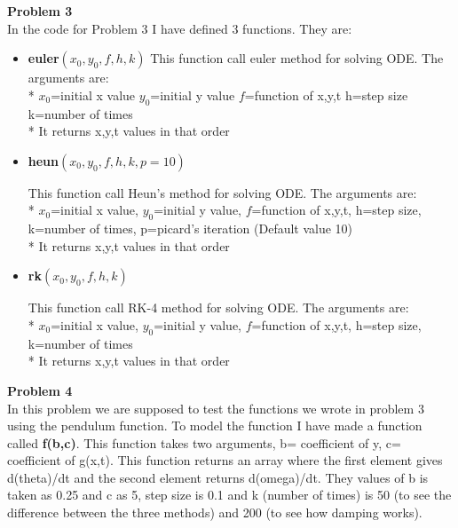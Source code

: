 \documentclass{article}
\begin{document}
\clearpage
\textbf{Problem 3}\vspace{1.5em}
\\
In the code for Problem 3 I have defined 3 functions. They are:
\begin{itemize}
\item{\textbf{euler$(x_0,y_0,f,h,k)$}}
This function call euler method for solving ODE. The arguments are:
\\*
       $ x_0$=initial x value
        $y_0$=initial y value
        $f$=function of x,y,t
        h=step size
        k=number of times
       \\*
        It returns x,y,t values in that order


\item{\textbf{heun$(x_0,y_0,f,h,k,p=10)$}}\vspace{0.2em}

This function call Heun's method for solving ODE. The arguments are:
\\*
        $x_0$=initial x value, 
        $y_0$=initial y value, 
        $f$=function of x,y,t, 
        h=step size, 
        k=number of times, 
        p=picard's iteration (Default value 10)
        \\*
        It returns x,y,t values in that order


\item{\textbf{rk$(x_0,y_0,f,h,k)$}}\vspace{0.2em}

This function call RK-4 method for solving ODE. The arguments are:
\\*
      $ x_0$=initial x value, 
        $y_0$=initial y value, 
        $f$=function of x,y,t, 
        h=step size, 
        k=number of times
        \\*
        It returns x,y,t values in that order


\vspace{0.2em}

\end{itemize}

\vspace{1.5em}
\textbf{Problem 4}\vspace{1.5em}
\\
In this problem we are supposed to test the functions we wrote in problem 3 using the pendulum function. To model the function I have made a function called \textbf{f(b,c)}. This function takes two arguments, b= coefficient of y, c= coefficient of g(x,t). This function returns an array where the first element gives d(theta)/dt and the second element returns d(omega)/dt. They values of b is taken as 0.25 and c as 5, step size is 0.1 and k (number of times) is 50 (to see the difference between the three methods) and 200 (to see how damping works).
\\
\end{document}
